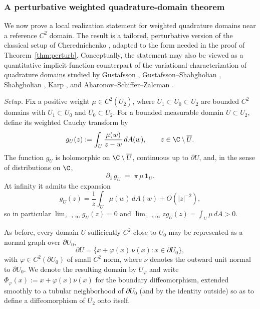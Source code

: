 \subsubsection{A perturbative weighted quadrature-domain theorem}\label{app:cherednichenko-type}

We now prove a local realization statement for weighted quadrature domains
near a reference \(C^2\) domain. The result is a tailored, perturbative
version of the classical setup of Cherednichenko \cite{Cherednichenko},
adapted to the form needed in the proof of Theorem~\ref{thm:perturb}.
Conceptually, the statement may also be viewed as a quantitative
implicit-function counterpart of the variational characterization of
quadrature domains studied by Gustafsson \cite{Gustafsson},
Gustafsson--Shahgholian \cite{Gustafsson-Shahgholian},
Shahgholian \cite{Shahgholian}, Karp \cite{Karp}, and
Aharonov--Schiffer--Zalcman \cite{Aharonov-Schiffer-Zalcman}.

\medskip
\noindent\emph{Setup.}
Fix a positive weight \(\mu\in C^2(\overline{U_2})\), where
\(U_1\subset U_0\subset U_2\) are bounded \(C^2\) domains with
\(\overline{U_1}\subset U_0\) and \(\overline{U_0}\subset U_2\).
For a bounded measurable domain \(U\subset U_2\), define its weighted
Cauchy transform by
\[
g_U(z):=\int_U \frac{\mu(w)}{z-w}\,dA(w),
\qquad z\in \C\setminus \overline U.
\]
The function \(g_U\) is holomorphic on \(\C\setminus \overline U\), continuous up to
\(\partial U\), and, in the sense of distributions on \(\C\),
\[
\partial_{\overline z}\, g_U \;=\; \pi\,\mu\,\mathbf{1}_U.
\]
At infinity it admits the expansion
\[
g_U(z)=\frac{1}{z}\int_U \mu(w)\,dA(w)+O(|z|^{-2}),
\]
so in particular \(\lim_{z\to\infty}g_U(z)=0\) and
\(\lim_{z\to\infty}zg_U(z)=\int_U\mu\,dA>0\).

As before, every domain \(U\) sufficiently \(C^2\)-close to \(U_0\) may be
represented as a normal graph over \(\partial U_0\),
\[
\partial U
=
\{x+\varphi(x)\,\nu(x):x\in \partial U_0\},
\]
with \(\varphi\in C^2(\partial U_0)\) of small \(C^2\) norm, where \(\nu\)
denotes the outward unit normal to \(\partial U_0\). We denote the resulting
domain by \(U_\varphi\) and write \(\Phi_\varphi(x):=x+\varphi(x)\nu(x)\) for
the boundary diffeomorphism, extended smoothly to a tubular neighborhood of
\(\partial U_0\) (and by the identity outside) so as to define a
diffeomorphism of \(\overline{U_2}\) onto itself.

